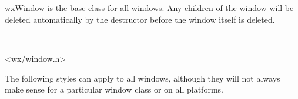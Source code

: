 \section{}\label{wxwindow}

wxWindow is the base class for all windows. Any children of the window will be deleted
automatically by the destructor before the window itself is deleted.



\\


<wx/window.h>


The following styles can apply to all windows, although they will not always make sense for a particular
window class or on all platforms.

